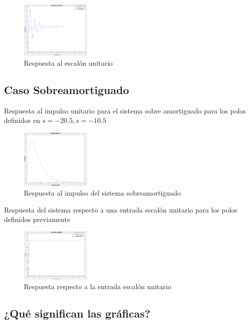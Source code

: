 \documentclass[conference]{IEEEtran}
\begin{document}
	\begin{figure}[h]
		\centering
		\includegraphics[width=0.3\textwidth]{media/sub-escalon}
		\caption{Respuesta al escalón unitario}
		\label{fig:sub-escalon}
	\end{figure}
	
	
	\subsection{Caso Sobreamortiguado}
	
	Respuesta al impulso unitario para el sistema sobre amortiguado para los polos definidos en $ s = -20.5, s = - 10.5$
	
	\begin{figure}[h]
		\centering
		\includegraphics[width=0.3\textwidth]{media/sobre-impulso}
		\caption{Respuesta al impulso del sistema sobreamortiguado}
		\label{fig:sobre-impulso}
	\end{figure}
	Respuesta del sistema respecto a una entrada escalón unitario para los polos definidos previamente
	\begin{figure}[h]
		\centering
		\includegraphics[width=0.3\textwidth]{media/sobre-escalon}
		\caption{Respuesta respecto a la entrada escalón unitario}
		\label{fig:sobre-escalon}
	\end{figure}
	
	\subsection{¿Qué significan las gráficas?}
	
\end{document}
